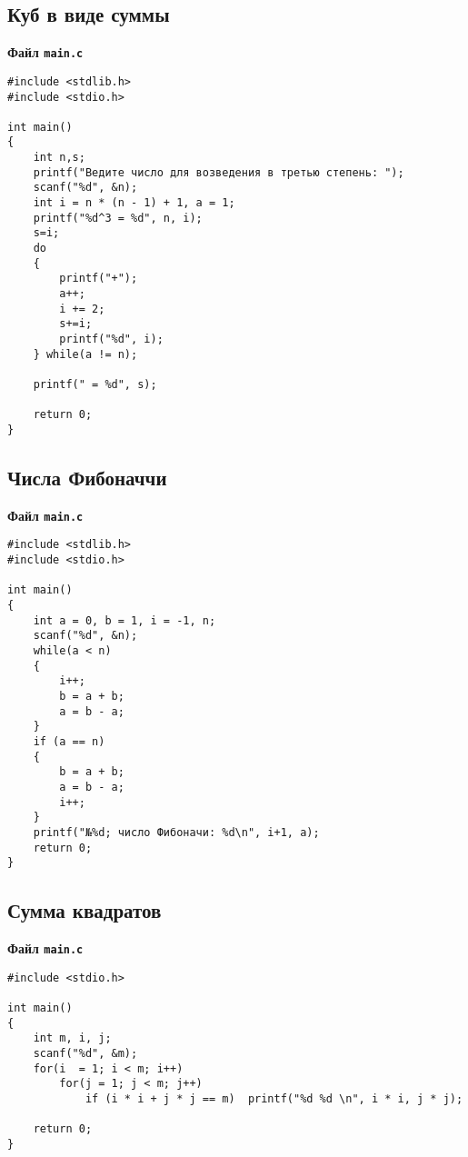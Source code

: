 \documentclass[a4paper,12pt]{extarticle}
\begin{document}
\subsection{Куб в виде суммы}\label{code:cube}
\centerline{\textbf{Файл \texttt{main.c}}}
\begin{verbatim}
#include <stdlib.h>
#include <stdio.h>

int main()
{
    int n,s;
    printf("Ведите число для возведения в третью степень: ");
    scanf("%d", &n);
    int i = n * (n - 1) + 1, a = 1;
    printf("%d^3 = %d", n, i);
    s=i;
    do
    {
        printf("+");
        a++;
        i += 2;
        s+=i;
        printf("%d", i);
    } while(a != n);

    printf(" = %d", s);

    return 0;
}
\end{verbatim}
\hrulefill

\subsection{Числа Фибоначчи}\label{code:fib}
\centerline{\textbf{Файл \texttt{main.c}}}
\begin{verbatim}
#include <stdlib.h>
#include <stdio.h>

int main()
{
    int a = 0, b = 1, i = -1, n;
    scanf("%d", &n);
    while(a < n)
    {
        i++;
        b = a + b;
        a = b - a;
    }
    if (a == n)
    {
        b = a + b;
        a = b - a;
        i++;
    }
    printf("№%d; число Фибоначи: %d\n", i+1, a);
    return 0;
}
\end{verbatim}
\hrulefill

\subsection{Сумма квадратов}\label{code:summ}
\centerline{\textbf{Файл \texttt{main.c}}}
\begin{verbatim}
#include <stdio.h>

int main()
{
    int m, i, j;
    scanf("%d", &m);
    for(i  = 1; i < m; i++)
        for(j = 1; j < m; j++)
            if (i * i + j * j == m)  printf("%d %d \n", i * i, j * j);

    return 0;
}
\end{verbatim}
\hrulefill
\end{document}
